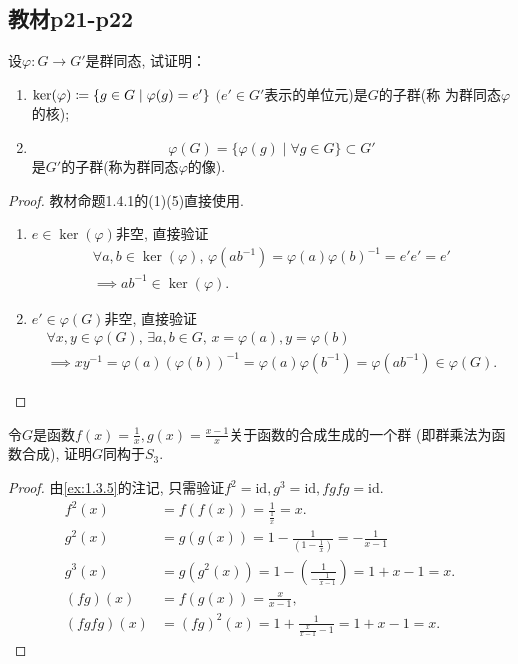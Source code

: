 \subsection{教材p21-p22}

\begin{problem}\label{ex:1.4.1}
    设$\varphi:G \to G'$是群同态, 试证明：
\begin{enumerate}[(1)]
    \item $\ker(\varphi) \mathrel{\coloneqq} \{g \in G \mid \varphi(g) = e'\}$ $(e' \in G'$表示的单位元)是$G$的子群(称
为群同态$\varphi$的核);
    \item \[\varphi(G) = \{\varphi(g) \mid \forall g \in G\} \subset G'\]
是$G'$的子群(称为群同态$\varphi$的像).
\end{enumerate}
\end{problem}

\begin{proof}
    教材命题1.4.1的(1)(5)直接使用.
\begin{enumerate}[(1)]
    \item $e \in \ker(\varphi)$非空, 直接验证\[
    \begin{gathered}
        \forall a, b \in \ker(\varphi),\, \varphi(ab^{-1}) = \varphi(a)\varphi(b)^{-1} = e'e' = e'\\
        \implies ab^{-1} \in \ker(\varphi).
    \end{gathered}
    \]
    \item $e' \in \varphi(G)$非空, 直接验证\[
    \begin{gathered}
        \forall x, y \in \varphi(G),\, \exists a, b \in G,\, x = \varphi(a), y = \varphi(b)\\
        \implies xy^{-1} = \varphi(a)(\varphi(b))^{-1} = \varphi(a)\varphi(b^{-1}) = \varphi(ab^{-1}) \in \varphi(G).
    \end{gathered}
    \]
\end{enumerate}
\end{proof}

\begin{problem}
    令$G$是函数$f(x) = \frac1x, g(x) = \frac{x-1}x$关于函数的合成生成的一个群
(即群乘法为函数合成), 证明$G$同构于$S_3$.
\end{problem}

\begin{proof}
    由\ref{ex:1.3.5}的注记, 只需验证$f^2 = \mathrm{id}, g^3 = \mathrm{id}, fgfg = \mathrm{id}$.
\[
\begin{aligned}
    f^2(x) &= f(f(x)) = \frac{1}{\frac{1}{x}} = x.\\
    g^2(x) &= g(g(x)) = 1 - \frac{1}{(1 - \frac{1}{x})} = -\frac{1}{x - 1}\\
    g^3(x) &= g(g^2(x)) = 1 - (\frac{1}{-\frac{1}{x - 1}}) = 1 + x - 1 = x.\\
    (fg)(x) &= f(g(x)) = \frac{x}{x - 1},\\
    (fgfg)(x) &= (fg)^2(x) = 1 + \frac{1}{\frac{x}{x - 1} - 1} = 1 + x - 1 = x.
\end{aligned}
\]

\end{proof}

